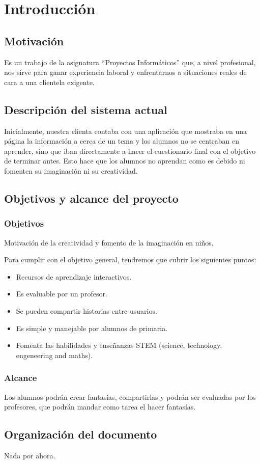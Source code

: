 \chapter{Introducción}
\section{Motivación}
Es un trabajo de la asignatura ``Proyectos Informáticos'' que, a nivel profesional, nos sirve para ganar experiencia laboral y enfrentarnos a situaciones reales de cara a una clientela exigente.

\section{Descripción del sistema actual}
Inicialmente, nuestra clienta contaba con una aplicación que mostraba en una página la información a cerca de un tema y los alumnos no se centraban en aprender, sino que iban directamente a hacer el cuestionario final con el objetivo de terminar antes. Esto hace que los alumnos no aprendan como es debido ni fomenten su imaginación ni su creatividad.

\section{Objetivos y alcance del proyecto}
\subsection{Objetivos}
Motivación de la creatividad y fomento de la imaginación en niños.

Para cumplir con el objetivo general, tendremos que cubrir los siguientes puntos:
\begin{itemize}
	\item Recursos de aprendizaje interactivos.
	\item Es evaluable por un profesor.
	\item Se pueden compartir historias entre usuarios.
	\item Es simple y manejable por alumnos de primaria.
	\item Fomenta las habilidades y enseñanzas STEM (science, technology, engeneering and maths).
\end{itemize}

\subsection{Alcance}
Los alumnos podrán crear fantasías, compartirlas y podrán ser evaluadas por los profesores, que podrán mandar como tarea el hacer fantasías.

\section{Organización del documento}
Nada por ahora.
